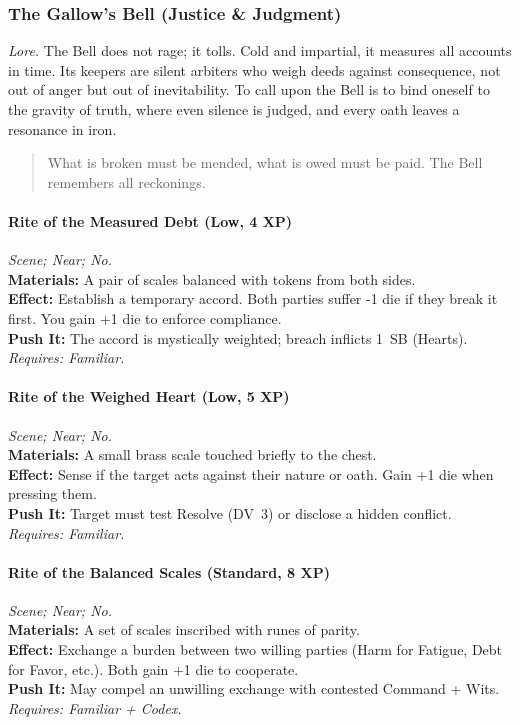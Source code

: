 
\subsubsection{The Gallow's Bell (Justice \& Judgment)}
\textit{Lore.} The Bell does not rage; it tolls. Cold and impartial, it measures all accounts in time. Its keepers are silent arbiters who weigh deeds against consequence, not out of anger but out of inevitability. To call upon the Bell is to bind oneself to the gravity of truth, where even silence is judged, and every oath leaves a resonance in iron.

\begin{quote}
What is broken must be mended, what is owed must be paid. The Bell remembers all reckonings.
\end{quote}

\paragraph*{Rite of the Measured Debt (Low, 4 XP)} \emph{Scene; Near; No.}\\
\textbf{Materials:} A pair of scales balanced with tokens from both sides.\\
\textbf{Effect:} Establish a temporary accord. Both parties suffer -1 die if they break it first. You gain +1 die to enforce compliance.\\
\textbf{Push It:} The accord is mystically weighted; breach inflicts 1~SB (Hearts).\\
\emph{Requires: Familiar.}

\paragraph*{Rite of the Weighed Heart (Low, 5 XP)} \emph{Scene; Near; No.}\\
\textbf{Materials:} A small brass scale touched briefly to the chest.\\
\textbf{Effect:} Sense if the target acts against their nature or oath. Gain +1 die when pressing them.\\
\textbf{Push It:} Target must test Resolve (DV~3) or disclose a hidden conflict.\\
\emph{Requires: Familiar.}

\paragraph{Rite of the Balanced Scales (Standard, 8 XP)} \emph{Scene; Near; No.}\\
\textbf{Materials:} A set of scales inscribed with runes of parity.\\
\textbf{Effect:} Exchange a burden between two willing parties (Harm for Fatigue, Debt for Favor, etc.). Both gain +1 die to cooperate.\\
\textbf{Push It:} May compel an unwilling exchange with contested Command + Wits.\\
\emph{Requires: Familiar + Codex.}

